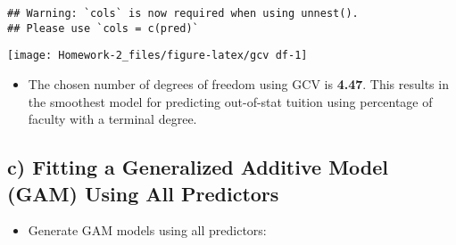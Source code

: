 \documentclass[
]{article}
\newenvironment{Shaded}{\begin{snugshade}}{\end{snugshade}}
\newcommand{\DataTypeTok}[1]{\textcolor[rgb]{0.13,0.29,0.53}{#1}}
\newcommand{\FloatTok}[1]{\textcolor[rgb]{0.00,0.00,0.81}{#1}}
\newcommand{\KeywordTok}[1]{\textcolor[rgb]{0.13,0.29,0.53}{\textbf{#1}}}
\newcommand{\NormalTok}[1]{#1}
\newcommand{\OperatorTok}[1]{\textcolor[rgb]{0.81,0.36,0.00}{\textbf{#1}}}
\newcommand{\StringTok}[1]{\textcolor[rgb]{0.31,0.60,0.02}{#1}}
\providecommand{\tightlist}{%
  \setlength{\itemsep}{0pt}\setlength{\parskip}{0pt}}
\begin{document}
\begin{verbatim}
## Warning: `cols` is now required when using unnest().
## Please use `cols = c(pred)`
\end{verbatim}

\begin{Shaded}
\end{Shaded}

\texttt{[image: Homework-2\_files/figure-latex/gcv df-1]}

\begin{itemize}
\tightlist
\item
  The chosen number of degrees of freedom using GCV is \textbf{4.47}.
  This results in the smoothest model for predicting out-of-stat tuition
  using percentage of faculty with a terminal degree.
\end{itemize}

\hypertarget{c-fitting-a-generalized-additive-model-gam-using-all-predictors}{%
\subsection{\texorpdfstring{\textbf{c) Fitting a Generalized Additive
Model (GAM) Using All
Predictors}}{c) Fitting a Generalized Additive Model (GAM) Using All Predictors}}\label{c-fitting-a-generalized-additive-model-gam-using-all-predictors}}

\begin{itemize}
\tightlist
\item
  Generate GAM models using all predictors:
\end{itemize}
\end{document}
